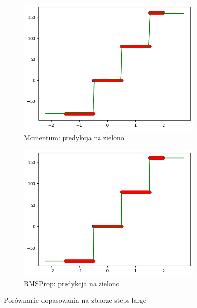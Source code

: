 \documentclass{article}
\begin{document}
\begin{figure}[H]
    \centering
    \begin{subfigure}[b]{0.48\textwidth}
        \centering
        \includegraphics[width=\textwidth]{img/nn3/steps-large_momentum_fit.png}
        \caption{Momentum: predykcja na zielono}
    \end{subfigure}
    \hfill
    \begin{subfigure}[b]{0.48\textwidth}
        \centering
        \includegraphics[width=\textwidth]{img/nn3/steps-large_rms_fit.png}
        \caption{RMSProp: predykcja na zielono}
    \end{subfigure}
    \caption{Porównanie dopasowania na zbiorze steps-large}
\end{figure}
\end{document}
